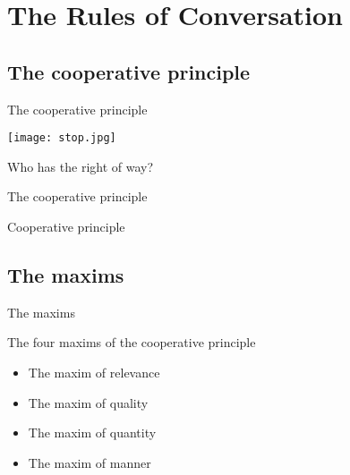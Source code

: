 \documentclass{beamer}
\subtitle[Conversation Rules]{The Rules of Conversation}
\makeatletter
\newcommand{\suboneone}{The cooperative principle}
\newcommand{\subonetwo}{The maxims}
\newcommand{\relevance}{
    \begin{tabular}{r @{: } l}
      Kim   & \uttr{How are you today?} \\
      Sandy & \uttr{Oh, Harrisburg is the capital of Pennsylvania.} \\
      Kim   & \uttr{Really? I thought the weather would be warmer.} \\
      Sandy & \begin{tabular}[t]{@{} l @{}}
                `Well, in my opinion, the soup could use a little \\
                more salt.'
              \end{tabular}
    \end{tabular}
  }
\makeatother
\begin{document}
  

  \section{The Rules of Conversation}
    \subsection{\suboneone}
      \begin{frame}{\suboneone}
        \begin{center}
          \texttt{[image: stop.jpg]}
        \end{center}
        \begin{block}{Who has the right of way?}
        \end{block}
      \end{frame}

      \begin{frame}{\suboneone}
        \begin{alertblock}{Cooperative principle \parencite{grice_logic_1989}}
          
        \end{alertblock}
      \end{frame}

    \subsection{\subonetwo}
      \begin{frame}{\subonetwo}
        \begin{block}{The four maxims of the cooperative principle}
          \begin{itemize}
            \item The maxim of relevance
            \item The maxim of quality
            \item The maxim of quantity
            \item The maxim of manner
          \end{itemize}
        \end{block}
      \end{frame}
\end{document}
